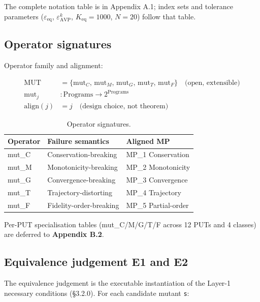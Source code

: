 \documentclass[manuscript,screen,review]{acmart}
\begin{document}
The complete notation table is in Appendix A.1; index sets and tolerance
parameters ($\varepsilon_{\mathrm{eq}}$, $\varepsilon_{\mathrm{AVP}}^k$,
$K_{\mathrm{eq}} = 1000$, $N = 20$) follow that table.

\subsection{Operator signatures}\label{operator-signatures}

Operator family and alignment:

\begin{align*}
\mathrm{MUT} &= \{\mathrm{mut}_C,\, \mathrm{mut}_M,\, \mathrm{mut}_G,\, \mathrm{mut}_T,\, \mathrm{mut}_F\} \quad \text{(open, extensible)} \\
\mathrm{mut}_j &: \text{Programs} \to 2^{\text{Programs}} \\
\mathrm{align}(j) &= j \quad \text{(design choice, not theorem)}
\end{align*}

{%
\begin{longtable}[]{@{}lll@{}}
\caption{Operator signatures.}\label{tab:p2-01}\\
\toprule\noalign{}
Operator & Failure semantics & Aligned MP \\
\midrule\noalign{}
\endhead
\bottomrule\noalign{}
\endlastfoot
mut\_C & Conservation-breaking & MP\_1 Conservation \\
mut\_M & Monotonicity-breaking & MP\_2 Monotonicity \\
mut\_G & Convergence-breaking & MP\_3 Convergence \\
mut\_T & Trajectory-distorting & MP\_4 Trajectory \\
mut\_F & Fidelity-order-breaking & MP\_5 Partial-order \\
\end{longtable}
}

Per-PUT specialisation tables (mut\_C/M/G/T/F across 12 PUTs and 4
classes) are deferred to \textbf{Appendix B.2}.

\subsection{Equivalence judgement E1 and E2}\label{equivalence-judgement-e1-e2-layer-2}

The equivalence judgement is the executable instantiation of the Layer-1
necessary conditions (§3.2.0). For each candidate mutant
\texttt{s\textquotesingle{}}:
\end{document}
